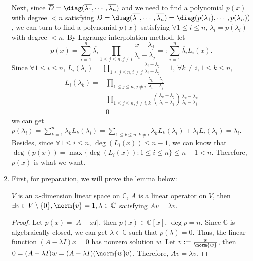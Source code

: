 \documentclass{ctexart}
\begin{document}
\begin{solution}
\begin{enumerate}
     Next, since \(\overline{D} =\diag(\overline{\lambda_1},\cdots,\overline{\lambda_n}) \) and we need to find a polynomial \(p(x)\) with degree \(<n \) 
     satisfying \(\overline{D}=\diag(\overline{\lambda_1},\cdots,\overline{\lambda_n})=\diag(p(\lambda_1),\cdots,p(\lambda_n)) \), 
     we can turn to find a polynomial \(p(x) \) satisfying \(\forall 1 \leq i \leq n \), \(\overline{\lambda_i}=p(\lambda_i) \) with degree \(<n \). 
     By Lagrange interpolation method, let \[ p(x)=\sum_{i=1}^{n}\overline{\lambda_i}\prod_{1 \leq j \leq n, j \neq i} \frac{x-\lambda_j}{\lambda_i-\lambda_j}=:\sum_{i=1}^{n}\overline{\lambda_i}L_i(x) .\] 
     Since \(\forall 1 \leq i \leq n \), \(L_i(\lambda_i)=\prod_{1 \leq j \leq n, i \neq j}\frac{\lambda_i-\lambda_j}{\lambda_i-\lambda_j}=1 \), \( \forall k \neq i, 1 \leq k \leq n,\) 
     \[
       \begin{aligned}
         L_i(\lambda_k)=&\prod_{1 \leq j \leq n, j \neq i} \frac{\lambda_k-\lambda_j}{\lambda_i-\lambda_j}\\
         =&\prod_{1 \leq j \leq n, j \neq i,k} (\frac{\lambda_k-\lambda_j}{\lambda_i-\lambda_j}) \frac{\lambda_k-\lambda_k}{\lambda_i-\lambda_j}\\
         =&0 
       \end{aligned}
      \]
      we can get \(p(\lambda_i)=\sum_{k=1}^{n}\overline{\lambda_k}L_k(\lambda_i)=\sum_{1 \leq k \leq n, k \neq i}\overline{\lambda_k} L_k(\lambda_i) + \overline{\lambda_i}L_i(\lambda_i)=\overline{\lambda_i} \).
      Besides, since \(\forall 1 \leq i \leq n \), \( \deg(L_i(x)) \leq n -1\), we can know that \(\deg(p(x))=\max\{\deg(L_i(x)):1 \leq i \leq n\} \leq n-1 <n\). 
      Therefore, \(p(x) \) is what we want.
    \item First, for preparation, we will prove the lemma below: 
      \begin{lemma}\label{lem:normal}
        \(V \) is an \(n \)-dimension linear space on \(\mathbb{C} \), \(A \) is a linear operator on \(V \), 
        then \(\exists v \in V\setminus\{0\} , \norm{v}=1 , \lambda \in \mathbb{C}\) satisfying \(Av=\lambda v \).
      \end{lemma}
     \begin{proof}
      Let \(p(x)=|A-xI| \), then \(p(x) \in \mathbb{C}[x] \), \(\deg p =n \). Since \(\mathbb{C} \) is algebraically closed, we can get \(\lambda \in \mathbb{C}  \) such that 
       \(p(\lambda )=0 \). Thus, the linear function \((A-\lambda I)x=0 \) has nonzero solution \(w \).
       Let \(v:=\frac{w}{\norm{w}} \), then \(0=(A-\lambda I)w=(A-\lambda I)(\norm{w}v) \). Therefore, \(Av=\lambda v \).
     \end{proof}
     

\end{enumerate}
\end{solution}
\end{document}
